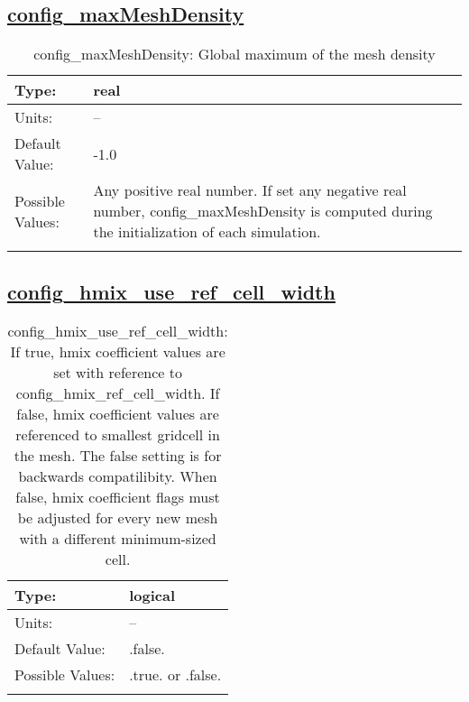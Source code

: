 \subsection[config\_maxMeshDensity]{\hyperref[sec:nm_tab_hmix]{config\_maxMeshDensity}}
\label{subsec:nm_sec_config_maxMeshDensity}
\begin{center}
\begin{longtable}{| p{2.0in} || p{4.0in} |}
    \hline
    Type: & real \\
    \hline
    Units: & -- \\
    \hline
    Default Value: & -1.0 \\
    \hline
    Possible Values: & Any positive real number. If set any negative real number, config\_maxMeshDensity is computed during the initialization of each simulation. \\
    \hline
    \caption{config\_maxMeshDensity: Global maximum of the mesh density}
\end{longtable}
\end{center}
\subsection[config\_hmix\_use\_ref\_cell\_width]{\hyperref[sec:nm_tab_hmix]{config\_hmix\_use\_ref\_cell\_width}}
\label{subsec:nm_sec_config_hmix_use_ref_cell_width}
\begin{center}
\begin{longtable}{| p{2.0in} || p{4.0in} |}
    \hline
    Type: & logical \\
    \hline
    Units: & -- \\
    \hline
    Default Value: & .false. \\
    \hline
    Possible Values: & .true. or .false. \\
    \hline
    \caption{config\_hmix\_use\_ref\_cell\_width: If true, hmix coefficient values are set with reference to config\_hmix\_ref\_cell\_width. If false, hmix coefficient values are referenced to smallest gridcell in the mesh. The false setting is for backwards compatilibity. When false, hmix coefficient flags must be adjusted for every new mesh with a different minimum-sized cell.}
\end{longtable}
\end{center}
